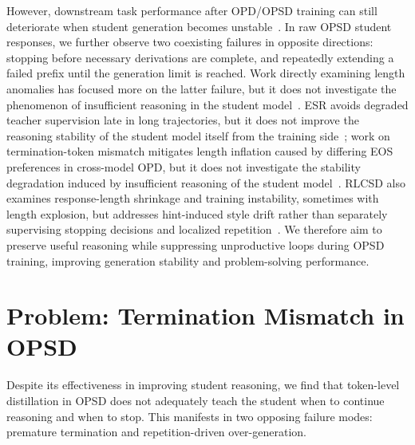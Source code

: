 \documentclass{article} %
\begin{document}
However, downstream task performance after OPD/OPSD training can still deteriorate when student generation becomes unstable~\citep{op2sd,lazaridis2026edgeopdinternalizingprivilegedcontext}. In raw OPSD student responses, we further observe two coexisting failures in opposite directions: stopping before necessary derivations are complete, and repeatedly extending a failed prefix until the generation limit is reached. Work directly examining length anomalies has focused more on the latter failure, but it does not investigate the phenomenon of insufficient reasoning in the student model~\citep{stableopd}. 
ESR avoids degraded teacher supervision late in long trajectories, but it does not improve the reasoning stability of the student model itself from the training side~\citep{esr};
work on termination-token mismatch mitigates length inflation caused by differing EOS preferences in cross-model OPD, but it does not investigate the stability degradation induced by insufficient reasoning of the student model~\citep{eosdisagree}. 
RLCSD also examines response-length shrinkage and training instability, sometimes with length explosion, but addresses hint-induced style drift rather than separately supervising stopping decisions and localized repetition~\citep{rlcsd}. 
We therefore aim to preserve useful reasoning while suppressing unproductive loops during OPSD training, improving generation stability and problem-solving performance.



\section{Problem: Termination Mismatch in OPSD}
\label{sec:motivating-analysis}

Despite its effectiveness in improving student reasoning, we find that token-level distillation in OPSD does not adequately teach the student when to continue reasoning and when to stop. This manifests in two opposing failure modes: premature termination and repetition-driven over-generation.
\end{document}
